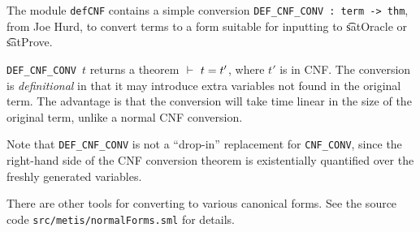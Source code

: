 The module {\tt defCNF} contains a simple conversion  {\tt DEF\_CNF\_CONV : term -> thm}, 
from Joe Hurd, to convert \HOL{} terms to a form suitable for inputting to \t{satOracle} or \t{satProve}.

{\small\verb+DEF_CNF_CONV+}~$t$ returns a theorem $\ \vdash\  t = t'$,
where $t'$ is in CNF. The conversion is {\it definitional} in that it may introduce extra variables not found in the original term. The advantage is that the conversion will take time linear in the size of the original term, unlike a normal CNF conversion.

Note that {\tt DEF\_CNF\_CONV} is not a ``drop-in'' replacement for {\tt CNF\_CONV}, since the right-hand side of the CNF conversion theorem is existentially quantified over the freshly generated variables.

There are other tools for converting to various canonical forms. See the source code
{\small\verb+src/metis/normalForms.sml+} for details.


%

